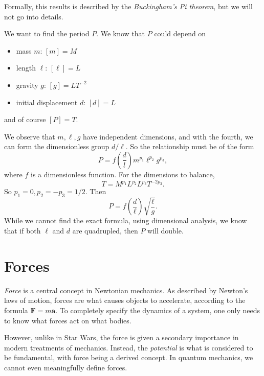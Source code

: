 \documentclass[a4paper]{article}
\begin{document}
Formally, this results is described by the \emph{Buckingham's Pi theorem}, but we will not go into details.

\begin{eg}\leavevmode
  \begin{center}
  \end{center}
  We want to find the period $P$. We know that $P$ could depend on
  \begin{itemize}
    \item mass $m$: $[m] = M$
    \item length $\ell$: $[\ell] = L$
    \item gravity $g$: $[g] = LT^{-2}$
    \item initial displacement $d$: $[d] = L$
  \end{itemize}
  and of course $[P] = T$.

  We observe that $m, \ell, g$ have independent dimensions, and with the fourth, we can form the dimensionless group $d/\ell$. So the relationship must be of the form
  \[
    P = f\left(\frac{d}{l}\right) m^{p_1}\ell^{p_2}g^{p_3},
  \]
  where $f$ is a dimensionless function. For the dimensions to balance,
  \[
    T = M^{p_1}L^{p_2}L^{p_3}T^{-2p_3}.
  \]
  So $p_1 = 0, p_2 = -p_3 = 1/2$. Then
  \[
    P = f\left(\frac{d}{\ell}\right) \sqrt{\frac{\ell}{g}}.
  \]
  While we cannot find the exact formula, using dimensional analysis, we know that if both $\ell$ and $d$ are quadrupled, then $P$ will double.
\end{eg}

\section{Forces}
\emph{Force} is a central concept in Newtonian mechanics. As described by Newton's laws of motion, forces are what causes objects to accelerate, according to the formula $\mathbf{F} = m\mathbf{a}$. To completely specify the dynamics of a system, one only needs to know what forces act on what bodies.

However, unlike in Star Wars, the force is given a secondary importance in modern treatments of mechanics. Instead, the \emph{potential} is what is considered to be fundamental, with force being a derived concept. In quantum mechanics, we cannot even meaningfully define forces.
\end{document}
